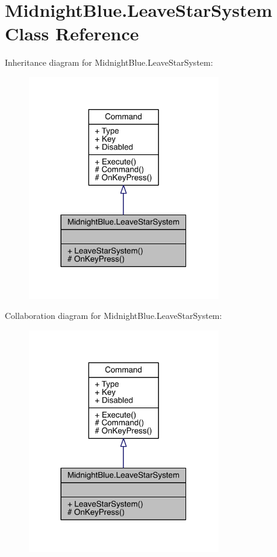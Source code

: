 \hypertarget{class_midnight_blue_1_1_leave_star_system}{}\section{Midnight\+Blue.\+Leave\+Star\+System Class Reference}
\label{class_midnight_blue_1_1_leave_star_system}


Inheritance diagram for Midnight\+Blue.\+Leave\+Star\+System\+:\nopagebreak
\begin{figure}[H]
\begin{center}
\leavevmode
\includegraphics[width=236pt]{class_midnight_blue_1_1_leave_star_system__inherit__graph}
\end{center}
\end{figure}


Collaboration diagram for Midnight\+Blue.\+Leave\+Star\+System\+:\nopagebreak
\begin{figure}[H]
\begin{center}
\leavevmode
\includegraphics[width=236pt]{class_midnight_blue_1_1_leave_star_system__coll__graph}
\end{center}
\end{figure}
